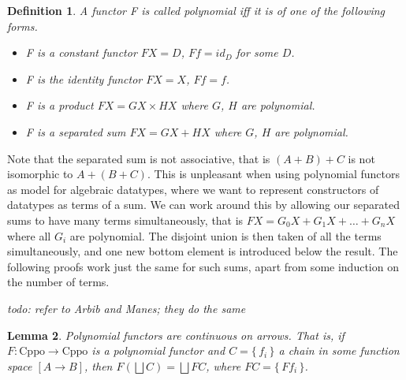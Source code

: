 \documentclass[a4paper]{article}
\newcommand{\arr}{\rightarrow}
\newcommand{\todo}[1]{\smallskip \noindent \emph{todo: #1} \smallskip}
\newcommand{\lub}{\bigsqcup}
\newcommand{\set}[1]{\{\,#1\,\}}
\newcommand{\Cppo}{\text{Cppo}}
\newcommand{\product}{\!\times\!}
\newtheorem{definition}{Definition}[section]
\newtheorem{lemma}[definition]{Lemma}
\begin{document}
\begin{definition}
A functor F is called \emph{polynomial} iff it is of one of the following forms.
\begin{itemize}[noitemsep]
\item F is a constant functor $FX = D$, $Ff = id_D$ for some $D$.
\item F is the identity functor $FX = X$, $Ff = f$.
\item F is a product $FX = GX \product HX$ where $G$, $H$ are polynomial.
\item F is a separated sum $FX = GX + HX$ where $G$, $H$ are polynomial.
\end{itemize}
\end{definition}

Note that the separated sum is not associative, that is $(A + B) + C$ is not
isomorphic to $A + (B + C)$. This is unpleasant when using polynomial functors
as model for algebraic datatypes, where we want to represent constructors of
datatypes as terms of a sum. We can work around this by allowing our separated
sums to have many terms simultaneously, that is $FX = G_0X + G_1X + \ldots +
G_nX$ where all $G_i$ are polynomial. The disjoint union is then taken of all
the terms simultaneously, and one new bottom element is introduced below the
result. The following proofs work just the same for such sums, apart from some
induction on the number of terms.

\todo{refer to Arbib and Manes; they do the same}

\begin{lemma} \label{lemPolynomialFunctorsContinuous}
Polynomial functors are continuous on arrows. That is, if $F : \Cppo \arr \Cppo$
is a polynomial functor and $C = \set{f_i}$ a chain in some function space $[A
\arr B]$, then $F(\lub C) = \lub FC$, where $FC = \set{Ff_i}$.
\end{lemma}
\end{document}
